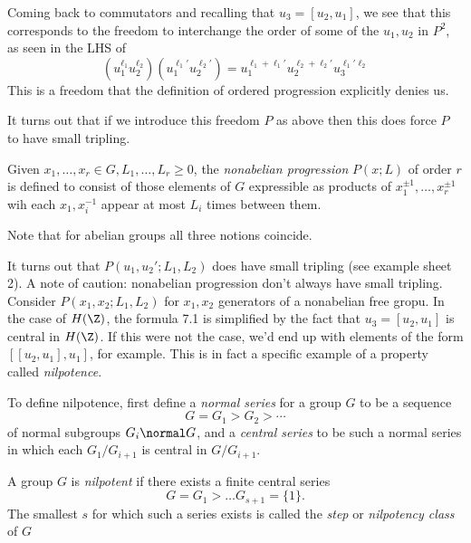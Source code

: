 \documentclass[a4paper]{article}
\begin{document}
Coming back to commutators and recalling that \(u_3 = [u_2, u_1]\), we see that this corresponds to the freedom to interchange the order of some of the \(u_1, u_2\) in \(P^2\), as seen in the LHS of
\[
  (u_1^{\ell_1} u_2^{\ell_2}) (u_1^{\ell_1'} u_2^{\ell_2'}) = u_1^{\ell_1 + \ell_1'} u_2^{\ell_2 + \ell_2'} u_3^{\ell_1'\ell_2}
\]
This is a freedom that the definition of ordered progression explicitly denies us.

It turns out that if we introduce this freedom \(P\) as above then this does force \(P\) to have small tripling.

\begin{definition}
  Given \(x_1, \dots, x_r \in G, L_1, \dots, L_r \geq 0\), the \emph{nonabelian progression} \(P(x; L)\) of order \(r\) is defined to consist of those elements of \(G\) expressible as products of \(x_1^{\pm 1}, \dots, x_r^{\pm 1}\) wih each \(x_1, x_i^{-1}\) appear at most \(L_i\) times between them.
\end{definition}

Note that for abelian groups all three notions coincide.

It turns out that \(P(u_1, u_2'; L_1, L_2)\) does have small tripling (see example sheet 2). A note of caution: nonabelian progression don't always have small tripling. Consider \(P(x_1, x_2; L_1, L_2)\) for \(x_1, x_2\) generators of a nonabelian free gropu. In the case of \(H(\Z)\), the formula 7.1 is simplified by the fact that \(u_3 = [u_2, u_1]\) is central in \(H(\Z)\). If this were not the case, we'd end up with elements of the form \([[u_2, u_1], u_1]\), for example. This is in fact a specific example of a property called \emph{nilpotence}.

To define nilpotence, first define a \emph{normal series} for a group \(G\) to be a sequence
\[
  G = G_1 > G_2 > \cdots
\]
of normal subgroups \(G_i \normal G\), and a \emph{central series} to be such a normal series in which each \(G_1/G_{i + 1}\) is central in \(G/G_{i + 1}\).

\begin{definition}
  A group \(G\) is \emph{nilpotent} if there exists a finite central series
  \[
    G = G_1 > \dots G_{s + 1} = \{1\}.
  \]
  The smallest \(s\) for which such a series exists is called the \emph{step} or \emph{nilpotency class} of \(G\)
\end{definition}
\end{document}
